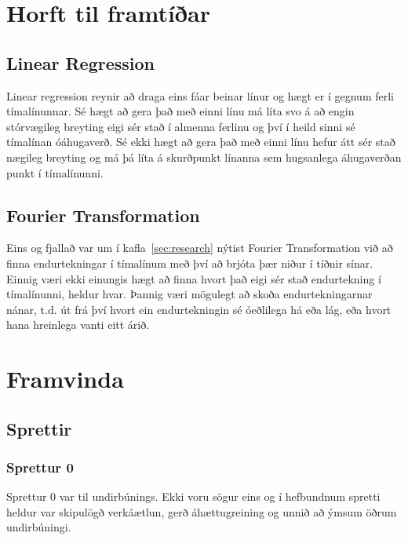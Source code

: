 \documentclass{article}
\begin{document}
\section{Horft til framtíðar}
\label{sec:future}

\subsection{Linear Regression}
\label{sec:future_linear}
Linear regression reynir að draga eins fáar beinar línur og hægt er í gegnum ferli tímalínunnar.
Sé hægt að gera það með einni línu má líta svo á að engin stórvægileg breyting 
eigi sér stað í almenna ferlinu og því í heild sinni sé tímalínan óáhugaverð. 
Sé ekki hægt að gera það með einni línu hefur átt sér stað nægileg breyting og má þá líta á skurðpunkt línanna sem
hugsanlega áhugaverðan punkt í tímalínunni.

\subsection{Fourier Transformation}
\label{sec:future_fourier}
Eins og fjallað var um í kafla~\ref{sec:research} nýtist Fourier
Transformation við að finna endurtekningar í tímalínum með því að brjóta þær
niður í tíðnir sínar.  
Einnig væri ekki einungis hægt að finna hvort það eigi sér stað endurtekning í
tímalínunni, heldur hvar. Þannig væri mögulegt að skoða endurtekningarnar nánar,
t.d. út frá því hvort ein endurtekningin sé óeðlilega há eða lág, eða hvort hana
hreinlega vanti eitt árið.



\section{Framvinda}
\subsection{Sprettir}

\subsubsection{Sprettur 0}
Sprettur 0 var til undirbúnings. Ekki voru sögur eins og í
hefbundnum spretti heldur var skipulögð verkáætlun, gerð áhættugreining og unnið að ýmsum öðrum
undirbúningi.
\end{document}
